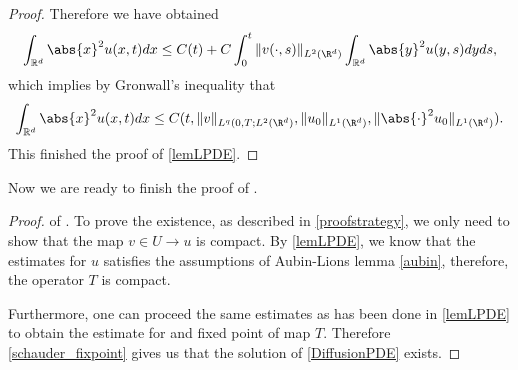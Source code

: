 \begin{proof}
   Therefore we have obtained 
   \begin{align*}
   \int_{\mathbb{R}^{d} } \abs{x}^2 u(x,t) dx \leq C(t)+C \int_0^{t}  \| v (\cdot,s)\|_{L^{2}(\R^d) } \int_{\mathbb{R}^{d} } \abs{y}^2 u(y,s) dy ds,
   \end{align*}
   which implies by Gronwall's inequality that 
   \begin{align*}
   \int_{\mathbb{R}^{d} } \abs{x}^2 u(x,t) dx \leq  C (t,\| v \|_{L^q(0,T;L^{2}(\R^d)},\|u_0\|_{L^{1}(\R^d) }, \|\abs{\cdot}^2u_0\|_{L^{1}(\R^d) } ).
   \end{align*}
This finished the proof of \autoref{lemLPDE}.   
\end{proof}
   
   
   \vskip5mm Now we are ready to finish the proof of .
   \begin{proof} of . To prove the existence, as described in \autoref{proofstrategy}, we only need to show that the map $v\in U\to u$ is compact. By \autoref{lemLPDE}, we know that the estimates for $u$ satisfies the assumptions of Aubin-Lions lemma \eqref{aubin}, therefore, the operator $T$ is compact.
   
   Furthermore, one can proceed the same estimates as has been done in \autoref{lemLPDE} to obtain the estimate for and fixed point of map $T$. Therefore \autoref{schauder_fixpoint} gives us that the solution of \eqref{DiffusionPDE} exists.
   

\end{proof}
